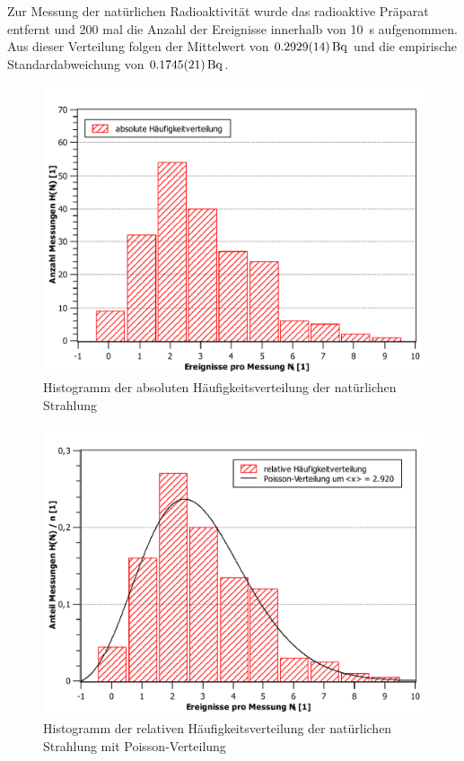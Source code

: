 	Zur Messung der natürlichen Radioaktivität wurde das radioaktive Präparat entfernt und 200 mal die Anzahl der Ereignisse innerhalb von \SI{10}{\second} aufgenommen.
	Aus dieser Verteilung folgen der Mittelwert von $\SI{0.2929+-0.0014}{\becquerel}$ und die empirische Standardabweichung von $\SI{0.1745+-0.0021}{\becquerel}$. 
	\begin{figure}[ht]
		\centering
		\includegraphics[width=\textwidth]{data/bckgndHistogrammAbs.pdf}
		\caption{Histogramm der absoluten Häufigkeitsverteilung der natürlichen Strahlung}
		\label{fig:absolut}	
	\end{figure}
	\begin{figure}[ht]
		\centering
		\includegraphics[width=\textwidth]{data/bckgndHistogrammRelPoisson.pdf}
		\caption{Histogramm der relativen Häufigkeitsverteilung der natürlichen Strahlung mit Poisson-Verteilung}
		\label{fig:relativ}	
	\end{figure}
